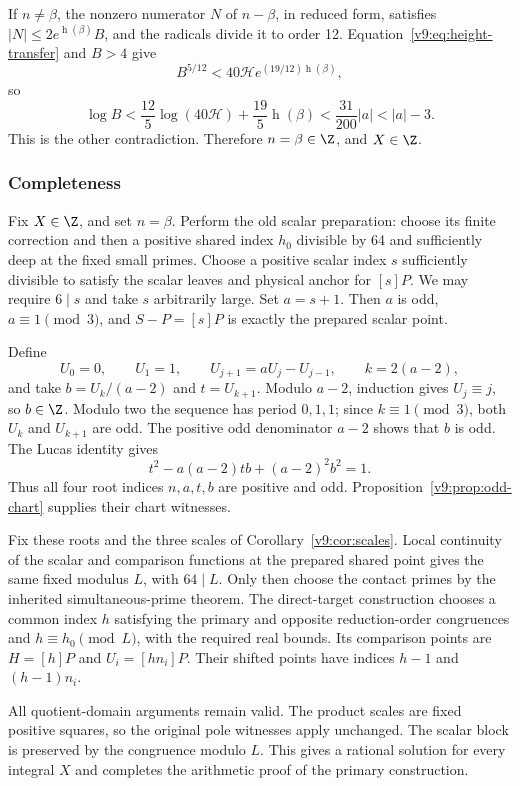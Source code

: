 If $n\ne\beta$, the nonzero numerator $N$ of $n-\beta$, in reduced form, satisfies $|N|\le2e^{\operatorname{h}(\beta)}B$, and the radicals divide it to order 12. Equation~\eqref{v9:eq:height-transfer} and $B>4$ give
\[
 B^{5/12}<40\mathcal H e^{(19/12)\operatorname{h}(\beta)},
\]
so
\[
 \log B<\frac{12}{5}\log(40\mathcal H)+\frac{19}{5}\operatorname{h}(\beta)
 <\frac{31}{200}|a|<|a|-3.
\]
This is the other contradiction. Therefore $n=\beta\in\Z$, and $X\in\Z$.

\subsubsection{Completeness}\label{subsec:v9-completeness}
Fix $X\in\Z$, and set $n=\beta$. Perform the old scalar preparation: choose its finite correction and then a positive shared index $h_0$ divisible by 64 and sufficiently deep at the fixed small primes. Choose a positive scalar index $s$ sufficiently divisible to satisfy the scalar leaves and physical anchor for $[s]P$. We may require $6\mid s$ and take $s$ arbitrarily large. Set $a=s+1$. Then $a$ is odd, $a\equiv1\pmod3$, and $S-P=[s]P$ is exactly the prepared scalar point.

Define
\[
 U_0=0,\qquad U_1=1,\qquad U_{j+1}=aU_j-U_{j-1},
 \qquad k=2(a-2),
\]
and take $b=U_k/(a-2)$ and $t=U_{k+1}$. Modulo $a-2$, induction gives $U_j\equiv j$, so $b\in\Z$. Modulo two the sequence has period $0,1,1$; since $k\equiv1\pmod3$, both $U_k$ and $U_{k+1}$ are odd. The positive odd denominator $a-2$ shows that $b$ is odd. The Lucas identity gives
\[
 t^2-a(a-2)tb+(a-2)^2b^2=1.
\]
Thus all four root indices $n,a,t,b$ are positive and odd. Proposition~\ref{v9:prop:odd-chart} supplies their chart witnesses.

Fix these roots and the three scales of Corollary~\ref{v9:cor:scales}. Local continuity of the scalar and comparison functions at the prepared shared point gives the same fixed modulus $L$, with $64\mid L$. Only then choose the contact primes by the inherited simultaneous-prime theorem. The direct-target construction chooses a common index $h$ satisfying the primary and opposite reduction-order congruences and $h\equiv h_0\pmod L$, with the required real bounds. Its comparison points are $H=[h]P$ and $U_i=[hn_i]P$. Their shifted points have indices $h-1$ and $(h-1)n_i$.

All quotient-domain arguments remain valid. The product scales are fixed positive squares, so the original pole witnesses apply unchanged. The scalar block is preserved by the congruence modulo $L$. This gives a rational solution for every integral $X$ and completes the arithmetic proof of the primary construction.

